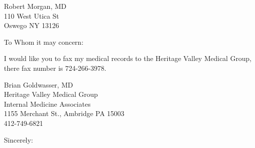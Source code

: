 \documentclass[
    jphafner,
    subject=left, %
    title=centering,
    backaddress=false,
]{scrlttr2}
\date{\today}
\begin{document}
\begin{letter}{%
Robert Morgan, MD \\
110 West Utica St \\
Oswego NY 13126
}
\setlength\parindent{0pt}

\opening{To Whom it may concern:}

I would like you to fax my medical records to the Heritage Valley Medical Group, there fax number is 724-266-3978.
\vspace{1em}


Brian Goldwasser, MD  \\
Heritage Valley Medical Group \\
Internal Medicine Associates \\
1155 Merchant St., Ambridge PA 15003 \\
412-749-6821 \\


\closing{Sincerely:}

\end{letter}
\end{document}
